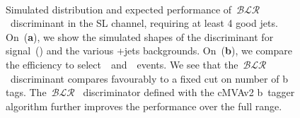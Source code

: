 \begin{figure}
\begin{centering}
\\
\caption{Simulated distribution and expected performance of~$\mathcal{BLR}$~discriminant in the SL channel, requiring at least 4 good jets. On~(\textbf{a}), we show the simulated shapes of the discriminant for signal~(\ttHbb) and the various \ttbar+jets backgrounds. On~(\textbf{b}), we compare the efficiency to select~\ttHbb~and~\ttlf~events. We see that the~$\mathcal{BLR}$~discriminant compares favourably to a fixed cut on number of b tags. The~$\mathcal{BLR}$~ discriminator defined with the cMVAv2 b~tagger algorithm further improves the performance over the full range.}
\label{fig:blr_discrimination}
\end{centering}
\end{figure}


